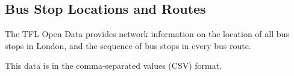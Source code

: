 \subsection{Bus Stop Locations and Routes}
\par The TFL Open Data provides network information on the location of all bus stops in London, and the sequence of bus stops in every bus route.

\par This data is in the comma-separated values (CSV) format.


